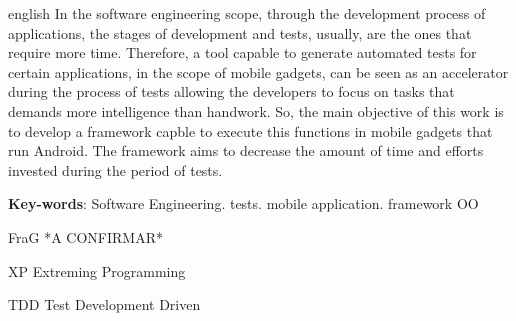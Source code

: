\documentclass[
    12pt,       %
    openright,      %
    twoside,      %
    a4paper,      %
    english,      %
    french,       %
    spanish,      %
    brazil,       %
    ]{abntex2}
\begin{document}
  \begin{resumo}[Abstract]
   \begin{otherlanguage*}{english}
     In the software engineering scope, through the development process of
     applications, the stages of development and tests, usually, are the
     ones that require more time. Therefore, a tool capable to generate
     automated tests for certain applications, in the scope of mobile
     gadgets, can be seen as an accelerator during the process of
     tests allowing the developers to focus on tasks that demands
     more intelligence than handwork. So, the main objective of this work
     is to develop a framework capble to execute this functions in mobile
     gadgets that run Android. The framework aims to decrease the amount of
     time and efforts invested during the period of tests.

     \vspace{\onelineskip}

     \noindent
     \textbf{Key-words}: Software Engineering. tests. mobile application. framework OO
   \end{otherlanguage*}
  \end{resumo}

  \listoffigures*
  \cleardoublepage

  \listoftables*
  \cleardoublepage

  \begin{siglas}
    \item[FraG] *A CONFIRMAR*
    \item[XP] Extreming Programming
    \item[TDD] Test Development Driven
  \end{siglas}

  \tableofcontents*
  \cleardoublepage



  \textual
\end{document}
